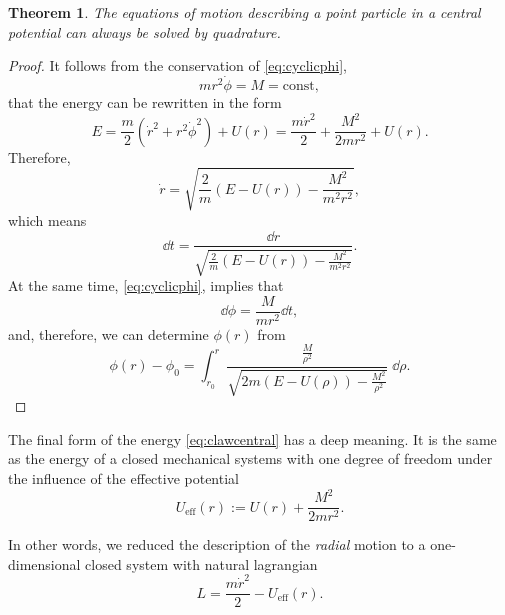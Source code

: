 \documentclass[english,fontsize=11pt,paper=b5]{scrbook}
\newtheorem{theorem}{Theorem}[chapter]
\theoremstyle{definition}
\begin{document}
    \begin{theorem}
      The equations of motion describing a point particle in a central potential can always be solved by quadrature.
    \end{theorem}
    \begin{proof}
      It follows from the conservation of \eqref{eq:cyclicphi},
      \begin{equation}\label{eq:cyclicphi1}
        m r^2 \dot \phi = M = \mathrm{const},
      \end{equation}
      that the energy can be rewritten in the form
      \begin{equation}\label{eq:clawcentral}
        E = \frac m2 \left(\dot r^2 + r^2 \dot \phi^2\right) + U(r)
        = \frac {m \dot r^2}2 + \frac{M^2}{2m r^2} + U(r).
      \end{equation}
      Therefore,
      \begin{equation}
        \dot r = \sqrt{\frac2m(E-U(r)) - \frac{M^2}{m^2 r^2}},
      \end{equation}
      which means
      \begin{equation}\label{eq:timedep}
        \dd t = \frac{\dd r}{\sqrt{\frac2m(E-U(r)) - \frac{M^2}{m^2 r^2}}}.
      \end{equation}
      At the same time, \eqref{eq:cyclicphi}, implies that
      \begin{equation}
        \dd \phi = \frac{M}{m r^2} \dd t,
      \end{equation}
      and, therefore, we can determine $\phi(r)$ from
      \begin{equation}\label{eq:deltaphi}
        \phi(r) - \phi_0 =
        \int_{r_0}^r \frac{\frac{M}{\rho^2}}{\sqrt{2m(E-U(\rho)) - \frac{M^2}{\rho^2}}}\;\dd \rho.
      \end{equation}
    \end{proof}

    The final form of the energy \eqref{eq:clawcentral} has a deep meaning.
    It is the same as the energy of a closed mechanical systems with one degree of freedom under the influence of the effective potential
    \begin{equation}\label{eq:effpotcp}
      U_{\mathrm{eff}}(r) := U(r) + \frac{M^2}{2 m r^2}.
    \end{equation}

    In other words, we reduced the description of the \emph{radial} motion to a one-dimensional closed system with natural lagrangian
    \begin{equation}\label{eq:efflagcp}
      L = \frac{m \dot r^2}{2} - U_{\mathrm{eff}}(r).
    \end{equation}
\end{document}
